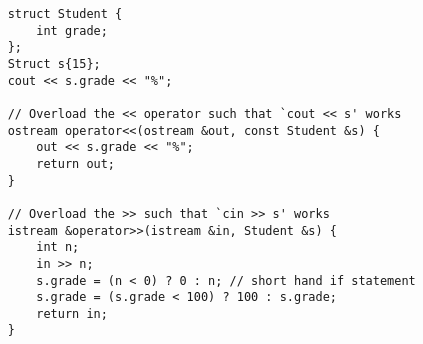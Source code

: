 \begin{lstlisting}
    struct Student {
        int grade;
    };
    Struct s{15};
    cout << s.grade << "%";
    
    // Overload the << operator such that `cout << s' works
    ostream operator<<(ostream &out, const Student &s) {
        out << s.grade << "%";
        return out;
    }

    // Overload the >> such that `cin >> s' works
    istream &operator>>(istream &in, Student &s) {
        int n;
        in >> n;
        s.grade = (n < 0) ? 0 : n; // short hand if statement
        s.grade = (s.grade < 100) ? 100 : s.grade;
        return in;
    }
\end{lstlisting}